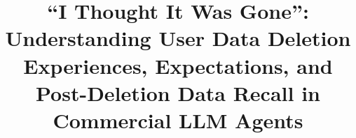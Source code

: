 \documentclass[conference,compsoc]{IEEEtran}
\begin{document}
\title{``I Thought It Was Gone'': Understanding User Data Deletion Experiences, Expectations, and Post-Deletion Data Recall in Commercial LLM Agents}

\maketitle


\IEEEpeerreviewmaketitle













\end{document}
